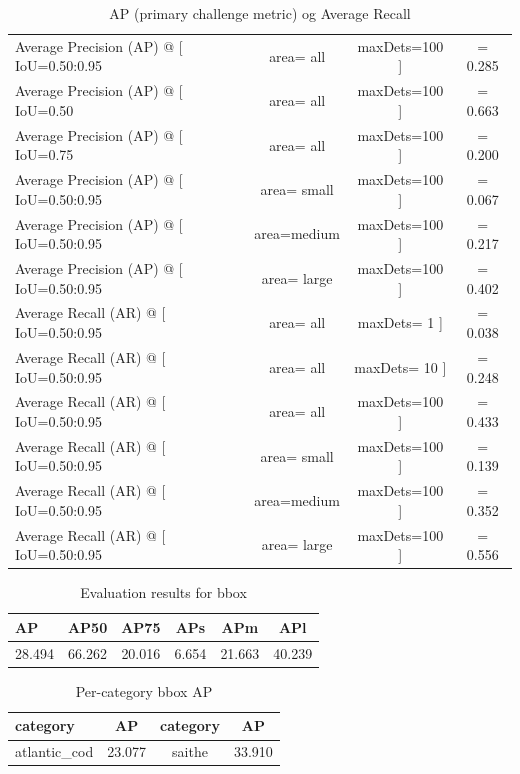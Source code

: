 \begin{table}[]
\bigskip
\centering
\label{tab:ap_retinanet} 
\caption{AP (primary challenge metric) og Average Recall}
\begin{tabular}[t]{lccc}
\toprule
 Average Precision  (AP) @ [ IoU=0.50:0.95 & area=   all & maxDets=100 ] &= 0.285 \\
 Average Precision  (AP) @ [ IoU=0.50      & area=   all & maxDets=100 ] &= 0.663 \\
 Average Precision  (AP) @ [ IoU=0.75      & area=   all & maxDets=100 ] &= 0.200 \\
 Average Precision  (AP) @ [ IoU=0.50:0.95 & area= small & maxDets=100 ] &= 0.067 \\
 Average Precision  (AP) @ [ IoU=0.50:0.95 & area=medium & maxDets=100 ] &= 0.217 \\
 Average Precision  (AP) @ [ IoU=0.50:0.95 & area= large & maxDets=100 ] &= 0.402 \\
\midrule
 Average Recall     (AR) @ [ IoU=0.50:0.95 & area=   all & maxDets=  1 ] &= 0.038 \\
 Average Recall     (AR) @ [ IoU=0.50:0.95 & area=   all & maxDets= 10 ] &= 0.248 \\
 Average Recall     (AR) @ [ IoU=0.50:0.95 & area=   all & maxDets=100 ] &= 0.433 \\
 Average Recall     (AR) @ [ IoU=0.50:0.95 & area= small & maxDets=100 ] &= 0.139 \\
 Average Recall     (AR) @ [ IoU=0.50:0.95 & area=medium & maxDets=100 ] &= 0.352 \\
 Average Recall     (AR) @ [ IoU=0.50:0.95 & area= large & maxDets=100 ] &= 0.556 \\
 \bottomrule	
 \end{tabular}
\end{table}

\begin{table}[]
\bigskip
\centering
\caption{Evaluation results for bbox} 
\label{tab:bbox_retinanet} 
\begin{tabular}[t]{lccccc}
\toprule
   AP   &  AP50  &  AP75  &  APs  &  APm   &  APl    \\
 \midrule
 28.494 & 66.262 & 20.016 & 6.654 & 21.663 & 40.239 \\
 \bottomrule	
 \end{tabular}
\end{table}

\begin{table}[]
\bigskip
\centering
\label{tab:per-category_bbox_retinanet} 
\caption{Per-category bbox AP} 
\begin{tabular}[t]{lccc}
\toprule
 category     & AP     & category   & AP      \\
 \midrule
 atlantic\_cod & 23.077 & saithe     & 33.910 \\
 \bottomrule	
\end{tabular}
\end{table}

